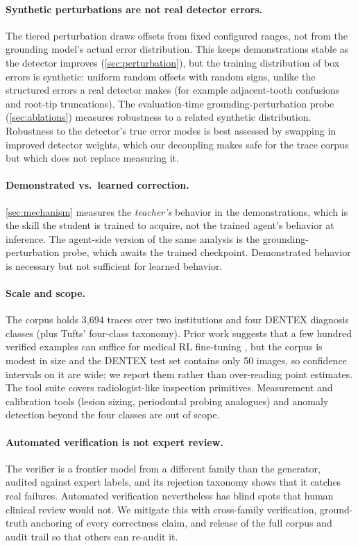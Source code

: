 \paragraph{Synthetic perturbations are not real detector errors.}
The tiered perturbation draws offsets from fixed configured ranges, not from the grounding
model's actual error distribution. This keeps demonstrations stable as the detector improves
(\cref{sec:perturbation}), but the training distribution of box errors is synthetic: uniform
random offsets with random signs, unlike the structured errors a real detector makes (for
example adjacent-tooth confusions and root-tip truncations). The evaluation-time
grounding-perturbation probe (\cref{sec:ablations}) measures robustness to a related synthetic
distribution. Robustness to the detector's true error modes is best assessed by swapping in
improved detector weights, which our decoupling makes safe for the trace corpus but which does
not replace measuring it.

\paragraph{Demonstrated vs.\ learned correction.}
\cref{sec:mechanism} measures the \emph{teacher's} behavior in the demonstrations, which is the
skill the student is trained to acquire, not the trained agent's behavior at inference. The
agent-side version of the same analysis is the grounding-perturbation probe, which awaits the
trained checkpoint. Demonstrated behavior is necessary but not sufficient for learned behavior.

\paragraph{Scale and scope.}
The corpus holds 3{,}694 traces over two institutions and four DENTEX diagnosis classes (plus
Tufts' four-class taxonomy). Prior work suggests that a few hundred verified examples can
suffice for medical RL fine-tuning \citep{pan2025medvlmr1}, but the corpus is modest in size and
the DENTEX test set contains only 50 images, so confidence intervals on it are wide; we report
them rather than over-reading point estimates. The tool suite covers radiologist-like
inspection primitives. Measurement and calibration tools (lesion sizing, periodontal probing
analogues) and anomaly detection beyond the four classes are out of scope.

\paragraph{Automated verification is not expert review.}
The verifier is a frontier model from a different family than the generator, audited against
expert labels, and its rejection taxonomy shows that it catches real failures. Automated
verification nevertheless has blind spots that human clinical review would not. We mitigate
this with cross-family verification, ground-truth anchoring of every correctness claim, and
release of the full corpus and audit trail so that others can re-audit it.

